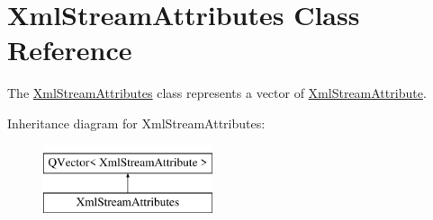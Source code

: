 \hypertarget{class_xml_stream_attributes}{}\section{Xml\+Stream\+Attributes Class Reference}
\label{class_xml_stream_attributes}


The \hyperlink{class_xml_stream_attributes}{Xml\+Stream\+Attributes} class represents a vector of \hyperlink{class_xml_stream_attribute}{Xml\+Stream\+Attribute}.  


Inheritance diagram for Xml\+Stream\+Attributes\+:\begin{figure}[H]
\begin{center}
\leavevmode
\includegraphics[height=2.000000cm]{class_xml_stream_attributes}
\end{center}
\end{figure}
